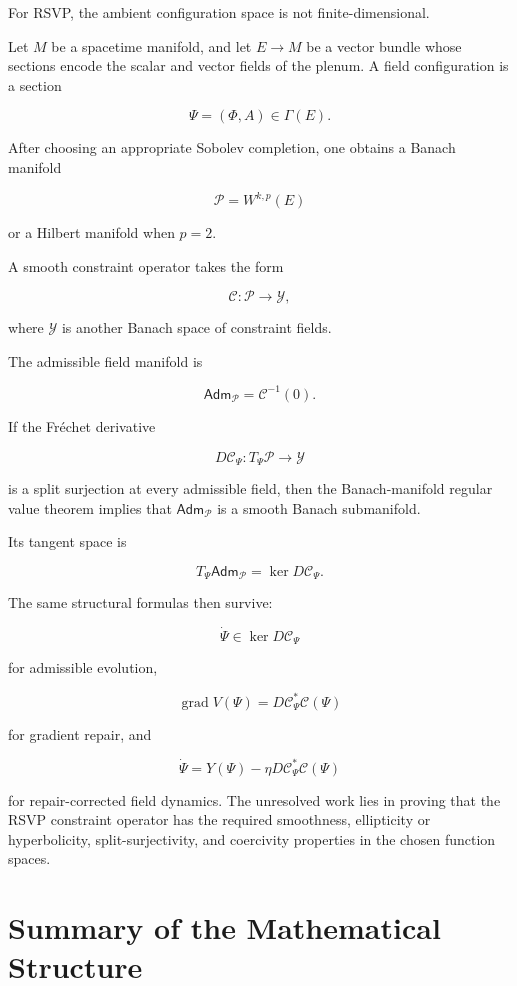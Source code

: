 \documentclass[11pt,oneside]{book}
\numberwithin{equation}{chapter}
\theoremstyle{definition}
\theoremstyle{plain}
\DeclareMathOperator{\grad}{grad}
\newcommand{\Adm}{\mathsf{Adm}}
\begin{document}
For RSVP, the ambient configuration space is not finite-dimensional.

Let \(M\) be a spacetime manifold, and let \(E\to M\) be a vector bundle
whose sections encode the scalar and vector fields of the plenum. A field
configuration is a section

\[
\Psi
=
(\Phi,A)
\in
\Gamma(E).
\]

After choosing an appropriate Sobolev completion, one obtains a Banach
manifold

\[
\mathcal P
=
W^{k,p}(E)
\]

or a Hilbert manifold when \(p=2\).

A smooth constraint operator takes the form

\[
\mathcal C:
\mathcal P
\longrightarrow
\mathcal Y,
\]

where \(\mathcal Y\) is another Banach space of constraint fields.

The admissible field manifold is

\[
\Adm_{\mathcal P}
=
\mathcal C^{-1}(0).
\]

If the Fréchet derivative

\[
D\mathcal C_{\Psi}:
T_{\Psi}\mathcal P
\longrightarrow
\mathcal Y
\]

is a split surjection at every admissible field, then the Banach-manifold
regular value theorem implies that
\(\Adm_{\mathcal P}\) is a smooth Banach submanifold.

Its tangent space is

\[
T_{\Psi}\Adm_{\mathcal P}
=
\ker D\mathcal C_{\Psi}.
\]

The same structural formulas then survive:

\[
\dot\Psi
\in
\ker D\mathcal C_{\Psi}
\]

for admissible evolution,

\[
\grad V(\Psi)
=
D\mathcal C_{\Psi}^{*}\mathcal C(\Psi)
\]

for gradient repair, and

\[
\dot\Psi
=
Y(\Psi)
-
\eta
D\mathcal C_{\Psi}^{*}\mathcal C(\Psi)
\]

for repair-corrected field dynamics. The unresolved work lies in proving that the RSVP constraint operator has the required smoothness, ellipticity or hyperbolicity, split-surjectivity, and coercivity properties in the chosen function spaces.

\section{Summary of the Mathematical Structure}
\end{document}

